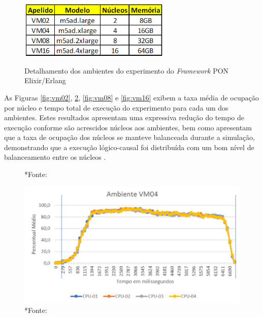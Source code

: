 \begin{figure}[!htb]
  \centering
  \caption{Detalhamento dos ambientes do experimento do \textit{Framework} PON
    Elixir/Erlang} \includegraphics[width=0.65\textwidth]{../figures/maquinas_elixir.png}
  \smallskip
  \label{fig:ambientes_elixir}
\end{figure}

As Figuras \ref{fig:vm02}, \ref{fig:vm04}, \ref{fig:vm08} e \ref{fig:vm16}
exibem a taxa média de ocupação por núcleo e tempo total de execução do
experimento para cada um dos ambientes. Estes resultados apresentam uma
expressiva redução do tempo de execução conforme são acrescidos núcleos aos
ambientes, bem como apresentam que a taxa de ocupação dos núcleos se manteve
balanceada durante a simulação, demonstrando que a execução lógico-causal foi
distribuída com um bom nível de balanceamento entre os núcleos
\cite{msc_negrini_2019}.

\begin{figure}[!htb]
  \centering
  \begin{minipage}{.5\textwidth}
    \centering
    *{Fonte: }
    \label{fig:vm02}
  \end{minipage}%
  \begin{minipage}{.5\textwidth}
    \centering
    \includegraphics[width=\linewidth]{../figures/vm04.png}
    \smallskip
    *{Fonte: }
    \label{fig:vm04}
  \end{minipage}
\end{figure}

